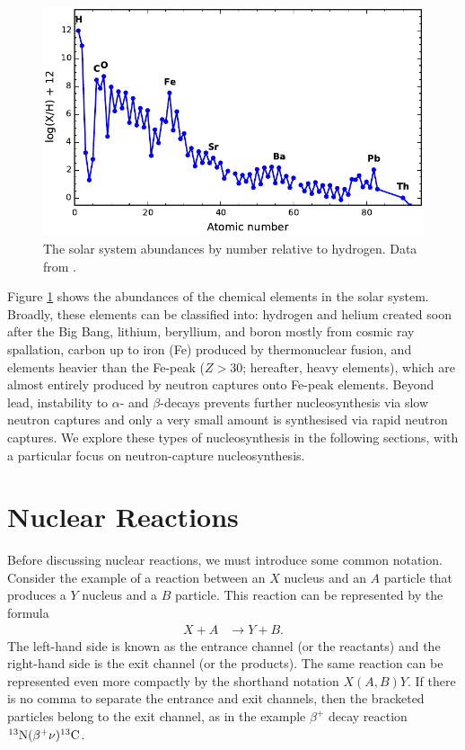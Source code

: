 \begin{figure}
 \begin{center}\includegraphics[width=\textwidth]{fig-solarabundances.pdf}\end{center}
 \caption{The solar system abundances by number relative to hydrogen. Data from \citet{Asplund:2009eu}.}\label{fig:solarabund}
\end{figure}

Figure \ref{fig:solarabund} shows the abundances of the chemical elements in the solar system. Broadly, these elements can be classified into: hydrogen and helium created soon after the Big Bang, lithium, beryllium, and boron mostly from cosmic ray spallation, carbon up to iron (Fe) produced by thermonuclear fusion, and elements heavier than the Fe-peak ($Z>30$; hereafter, heavy elements), which are almost entirely produced by neutron captures onto Fe-peak elements. Beyond lead, instability to $\alpha$- and $\beta$-decays prevents further nucleosynthesis via slow neutron captures \citep{Clayton:1967co} and only a very small amount is synthesised via rapid neutron captures. We explore these types of nucleosynthesis in the following sections, with a particular focus on neutron-capture nucleosynthesis.

\section{Nuclear Reactions}
Before discussing nuclear reactions, we must introduce some common notation. Consider the example of a reaction between an $X$ nucleus and an $A$ particle that produces a $Y$ nucleus and a $B$ particle. This reaction can be represented by the formula
\begin{align*}
	X + A &\longrightarrow Y + B.
\end{align*}
The left-hand side is known as the entrance channel (or the reactants) and the right-hand side is the exit channel (or the products). The same reaction can be represented even more compactly by the shorthand notation $X(A,B)Y$. If there is no comma to separate the entrance and exit channels, then the bracketed particles belong to the exit channel, as in the example $\beta^+$ decay reaction $\mbox{${}^{13}{\text{N}}$}(\beta^+\nu)\mbox{${}^{13}{\text{C}}$}$.

